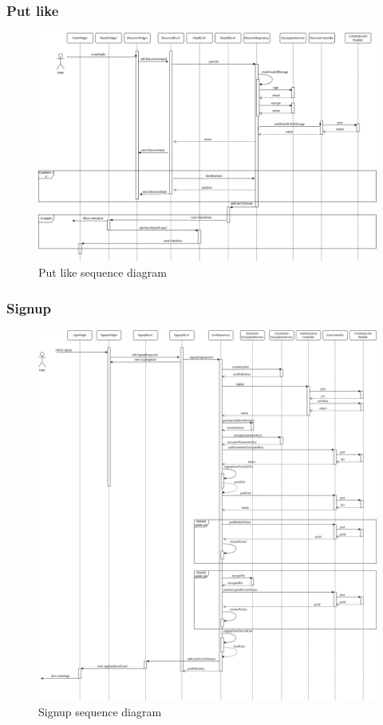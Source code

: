 \documentclass{article}
\begin{document}
\subsubsection{Put like}
\begin{figure}[ht]
	\centering
		\includegraphics[width=1.0\textwidth]{assets/images/put-like-sequence.png}
		\caption{Put like sequence diagram}
		\label{fig:put-like-sequence}
\end{figure}
\newpage
\subsubsection{Signup}
\begin{figure}[ht]
	\centering
		\includegraphics[width=1.0\textwidth]{assets/images/signup-sequence.png}
		\caption{Signup sequence diagram}
		\label{fig:signup-sequence}
\end{figure}
\newpage
\end{document}
